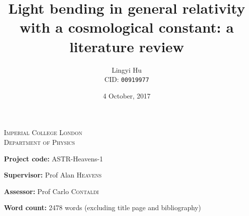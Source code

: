 



\begin{titlepage}
  \center

  \vspace*{2cm}
  \textsc{\Large Imperial College London}\\[0.5cm] 
  \textsc{\large Department of Physics}\\[0.5cm] 

  \title{\bf{Light bending in general relativity with a cosmological constant: a literature review}}
  \date{4 October, 2017}
  \author{Lingyi Hu\\ CID: \texttt{00919977}}

  {\let\newpage\relax\maketitle}
  \thispagestyle{empty}

  \vspace*{1cm}
  \noindent
  \large
  {\bf Project code:} ASTR-Heavens-1\par
  {\bf Supervisor:} Prof Alan \textsc{Heavens}\par
  {\bf Assessor:} Prof Carlo \textsc{Contaldi}

  \vspace*{1cm}

  {\bf Word count:}
  2478 words (excluding title page and bibliography)

  \vspace*{2cm}


\end{titlepage}

\tableofcontents

\vspace*{2cm}
\noindent











\newpage
\noindent
\vspace*{2cm}
\printbibliography[heading=bibintoc, title={References}]


